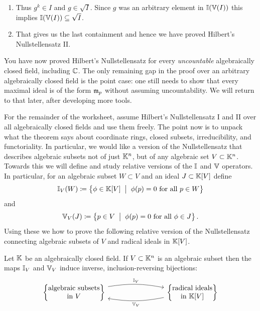 \documentclass[Notebook.tex]{subfiles}
\begin{document}
\begin{solution}
\begin{enumerate}
        \item Thus $g^k \in I$ and $g \in \sqrt{I}$. Since $g$ was an arbitrary element in $\mathbb I(\mathbb V(I))$ this implies $\mathbb I(\mathbb V(I))\subseteq \sqrt{I}$.
        
        \item That gives us the last containment and hence we have proved Hilbert's Nullstellensatz II. 
    \end{enumerate}
\end{solution}

\newpage 

\hrulefill

You have now proved Hilbert's Nullstellensatz for every \emph{uncountable} algebraically closed field, including $\mathbb C$. The only remaining gap in the proof over an arbitrary algebraically closed field is the point case: one still needs to show that every maximal ideal is of the form $\operatorname{\mathfrak{m}}_p$ without assuming uncountability. We will return to that later, after developing more tools.

For the remainder of the worksheet, assume Hilbert's Nullstellensatz I and II over all algebraically closed fields and use them freely. The point now is to unpack what the theorem says about coordinate rings, closed subsets, irreducibility, and functoriality. In particular, we would like a version of the Nullstellensatz that describes algebraic subsets not of just $\mathbb K^n$, but of any algebraic set $V \subset \mathbb K^n$. Towards this we will define and study relative versions of the $\mathbb I$ and $\mathbb V$ operators. In particular, for an algebraic subset $W \subset V$ and an ideal $J \subset \mathbb K[V]$ define
\[
\mathbb I_V(W)\coloneqq \left \{\phi \in \mathbb K[V] \;\; \big| \;\; \phi(p)=0 \text{ for all }p\in W\right\}
\] 
and 
\[
\mathbb V_V(J)\coloneqq \left\{p\in V \;\; \big| \;\;  \phi(p)=0 \text{ for all }\phi\in J\right\}.
\]
Using these we how to prove the following relative version of the Nullstellensatz connecting algebraic subsets of $V$ and radical ideals in $\mathbb K[V]$. 

\begin{theorem} Let $\mathbb K$ be an algebraically closed field. If $V \subset \mathbb K^n$ is an algebraic subset then the maps $\mathbb I_V$ and $\mathbb V_V$ induce inverse, inclusion-reversing bijections:
 \[
\begin{tikzcd}[row sep = .5 em, column sep = 8em]
\left\{ \begin{matrix} 
\text{algebraic subsets} \\
\text{in $V$}
\end{matrix} \right\} \arrow[r, bend left=10, "\I_V"] & \arrow[l,bend left=10,"\V_V"]
\left\{ \begin{matrix} 
\text{radical ideals} \\
\text{in $\K[V]$}
\end{matrix} \right\} 
\end{tikzcd}
\]
\end{theorem}
\end{document}
